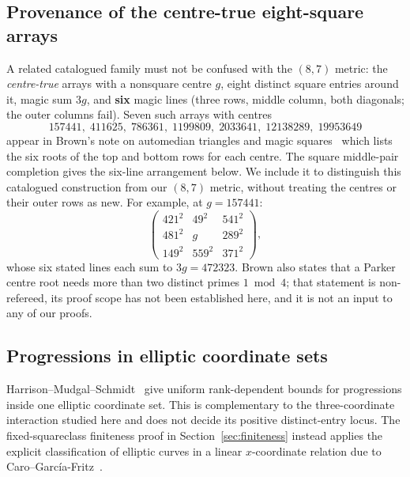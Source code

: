 \subsection{Provenance of the centre-true eight-square arrays}

A related catalogued family must not be confused with the $(8,7)$ metric:
the \emph{centre-true} arrays with a nonsquare centre $g$, eight distinct
square entries around it, magic sum $3g$, and \textbf{six} magic lines
(three rows, middle column, both diagonals; the outer columns fail). Seven
such arrays with centres
\[
157441,\;411625,\;786361,\;1199809,\;2033641,\;12138289,\;19953649
\]
appear in Brown's note on automedian triangles and magic
squares~\cite{BRO} which lists the six roots of the top and bottom rows for each centre.
The square middle-pair completion gives the six-line arrangement below.
We include it to distinguish this catalogued construction from our
$(8,7)$ metric, without treating the centres or their outer rows as new. For example, at $g=157441$:
\[
\begin{pmatrix}
421^2 & 49^2 & 541^2\\
481^2 & g & 289^2\\
149^2 & 559^2 & 371^2
\end{pmatrix},
\]
whose six stated lines each sum to $3g=472323$. Brown also states that a
Parker centre root needs more than two distinct primes $1\bmod4$; that
statement is non-refereed, its proof scope has not been established here,
and it is not an input to any of our proofs.



\subsection{Progressions in elliptic coordinate sets}

Harrison--Mudgal--Schmidt~\cite{HMS26} give uniform rank-dependent bounds
for progressions inside one elliptic coordinate set. This is complementary
to the three-coordinate interaction studied here and does not decide its
positive distinct-entry locus. The fixed-squareclass finiteness proof in
Section~\ref{sec:finiteness} instead applies the explicit classification
of elliptic curves in a linear $x$-coordinate relation due to
Caro--Garc\'ia-Fritz~\cite{CGF25}.
